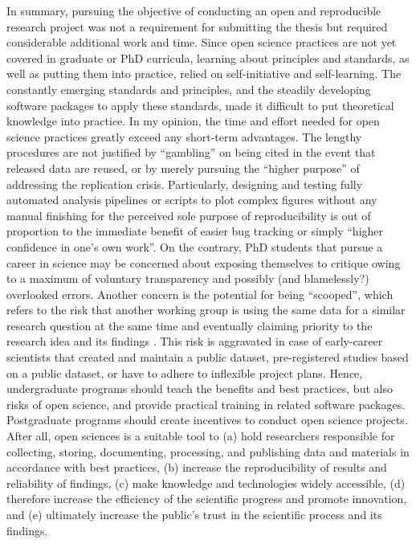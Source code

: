 %
In summary, pursuing the objective of conducting an open and reproducible
research project was not a requirement for submitting the thesis but required
considerable additional work and time.
%
Since open science practices are not yet covered in graduate or PhD curricula,
learning about principles and standards, as well as putting them into practice,
relied on self-initiative and self-learning.
%
The constantly emerging standards and principles, and the steadily developing
software packages to apply these standards, made it difficult to put theoretical
knowledge into practice.
%
In my opinion, the time and effort needed for open science practices greatly
exceed any short-term advantages.
%
The lengthy procedures are not justified by ``gambling'' on being cited in the
event that released data are reused, or by merely pursuing the ``higher
purpose'' of addressing the replication crisis.
%
Particularly, designing and testing fully automated analysis pipelines or
scripts to plot complex figures without any manual finishing for the perceived
sole purpose of reproducibility is out of proportion to the immediate benefit of
easier bug tracking or simply ``higher confidence in one's own work''.
%
On the contrary, PhD students that pursue a career in science may be concerned
about exposing themselves to critique owing to a maximum of voluntary
transparency and possibly (and blamelessly?) overlooked errors.
%
Another concern is the potential for being ``scooped'', which refers to the risk
that another working group is using the same data for a similar research
question at the same time and eventually claiming priority to the research idea
and its findings \citep[cf.][]{laine2017afraid}.
%
This risk is aggravated in case of early-career scientists that created and
maintain a public dataset, pre-registered studies based on a public dataset, or
have to adhere to inflexible project plans.
%
Hence, undergraduate programs should teach the benefits and best practices, but
also risks of open science, and provide practical training in related software
packages.
%
Postgraduate programs should create incentives to conduct open science projects.
%
After all, open sciences is a suitable tool to
%
(a) hold researchers responsible for collecting, storing, documenting,
processing, and publishing data and materials in accordance with best practices,
%
(b) increase the reproducibility of results and reliability of findings,
%
(c) make knowledge and technologies widely accessible,
%
(d) therefore increase the efficiency of the scientific progress and promote
innovation, and
%
(e) ultimately increase the public's trust in the scientific process and its
findings.


